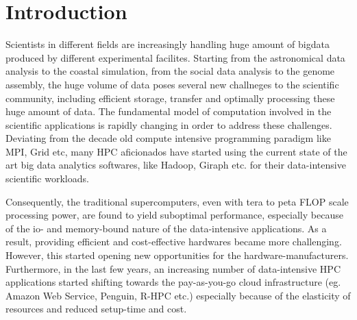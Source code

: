\documentclass[conference]{IEEEtran}
\begin{document}


%
\IEEEpeerreviewmaketitle



\section {Introduction}
Scientists in different fields are increasingly handling huge amount of bigdata produced by different experimental facilites.%
Starting from the astronomical data analysis to the coastal simulation, from the social data analysis to the genome assembly, the huge volume of data poses several new challneges to the scientific community, including  efficient storage, transfer and optimally processing these huge amount of data.
The fundamental model of computation involved in the scientific applications is rapidly changing in order to address these challenges.
Deviating from the decade old compute intensive programming paradigm like MPI, Grid etc, many HPC aficionados have started using the current state of the art big data analytics softwares, like Hadoop, Giraph etc. for their data-intensive scientific workloads.

Consequently, the traditional supercomputers, even with tera to peta FLOP scale processing power, are found to yield suboptimal performance, especially because of the io- and memory-bound nature of the data-intensive applications.
As a result, providing efficient and cost-effective hardwares became more challenging. However, this started opening new opportunities for the hardware-manufacturers.
Furthermore, in the last few years, an increasing number of data-intensive HPC applications started shifting towards the pay-as-you-go cloud infrastructure (eg. Amazon Web Service, Penguin, R-HPC etc.) especially because of the elasticity of resources and reduced setup-time and cost.
\end{document}

